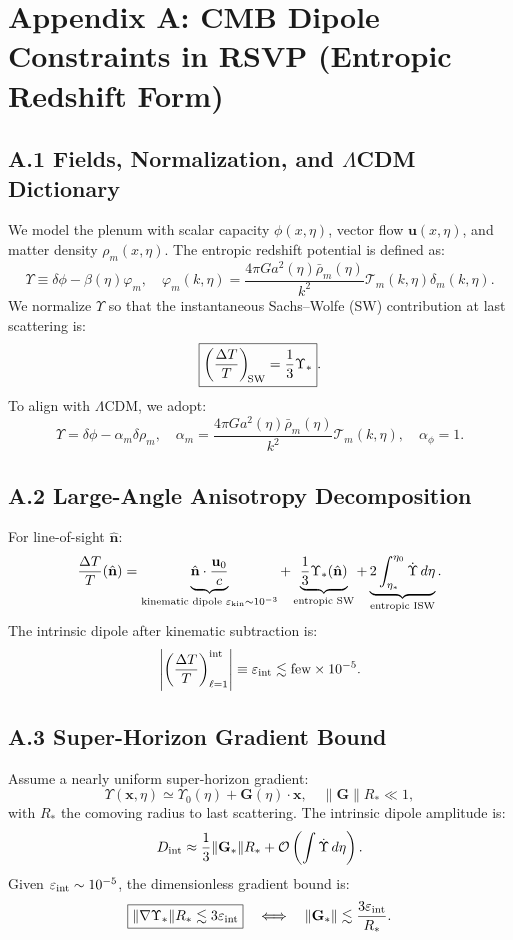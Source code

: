 \section*{Appendix A: CMB Dipole Constraints in RSVP (Entropic Redshift Form)}

\subsection*{A.1 Fields, Normalization, and $\Lambda$CDM Dictionary}
We model the plenum with scalar capacity \(\phi(x,\eta)\), vector flow \(\mathbf{u}(x,\eta)\), and matter density \(\rho_m(x,\eta)\). The entropic redshift potential is defined as:
\[
\boxed{\Upsilon \equiv \delta\phi - \beta(\eta)\varphi_m}, \quad \varphi_m(k,\eta) = \frac{4\pi G a^2(\eta) \bar{\rho}_m(\eta)}{k^2} \mathcal{T}_m(k,\eta) \delta_m(k,\eta).
\]
We normalize \(\Upsilon\) so that the instantaneous Sachs--Wolfe (SW) contribution at last scattering is:
\[
\boxed{\left(\frac{\Delta T}{T}\right)_{\!\rm SW} = \frac{1}{3} \Upsilon_*}.
\]
To align with \(\Lambda\)CDM, we adopt:
\[
\Upsilon = \delta\phi - \alpha_m \delta\rho_m, \quad \alpha_m = \frac{4\pi G a^2(\eta) \bar{\rho}_m(\eta)}{k^2} \mathcal{T}_m(k,\eta), \quad \alpha_\phi = 1.
\]

\subsection*{A.2 Large-Angle Anisotropy Decomposition}
For line-of-sight \(\hat{\mathbf{n}}\):
\[
\frac{\Delta T}{T}(\hat{\mathbf{n}}) = \underbrace{\hat{\mathbf{n}} \cdot \frac{\mathbf{u}_0}{c}}_{\text{kinematic dipole } \varepsilon_{\rm kin} \sim 10^{-3}} + \underbrace{\frac{1}{3} \Upsilon_*(\hat{\mathbf{n}})}_{\text{entropic SW}} + \underbrace{2 \int_{\eta_*}^{\eta_0} \dot{\Upsilon} \, d\eta}_{\text{entropic ISW}}.
\]
The intrinsic dipole after kinematic subtraction is:
\[
\left| \left( \frac{\Delta T}{T} \right)_{\ell=1}^{\rm int} \right| \equiv \varepsilon_{\rm int} \lesssim \text{few} \times 10^{-5}.
\]

\subsection*{A.3 Super-Horizon Gradient Bound}
Assume a nearly uniform super-horizon gradient:
\[
\Upsilon(\mathbf{x},\eta) \simeq \Upsilon_0(\eta) + \mathbf{G}(\eta) \cdot \mathbf{x}, \quad \|\mathbf{G}\| R_* \ll 1,
\]
with \(R_*\) the comoving radius to last scattering. The intrinsic dipole amplitude is:
\[
D_{\rm int} \approx \frac{1}{3} \|\mathbf{G}_*\| R_* + \mathcal{O}\left( \int \dot{\Upsilon} \, d\eta \right).
\]
Given \(\varepsilon_{\rm int} \sim 10^{-5}\), the dimensionless gradient bound is:
\[
\boxed{\|\nabla \Upsilon_*\| R_* \lesssim 3 \varepsilon_{\rm int}} \quad \Longleftrightarrow \quad \|\mathbf{G}_*\| \lesssim \frac{3 \varepsilon_{\rm int}}{R_*}.
\]

